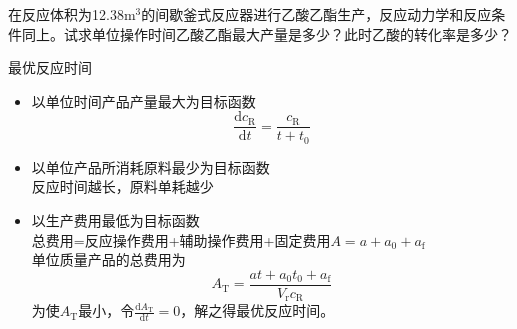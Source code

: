 \begin{frame}[t]{}
    \begin{example}
        在反应体积为12.38m$^3$的间歇釜式反应器进行乙酸乙酯生产，反应动力学和反应条件同上。试求单位操作时间乙酸乙酯最大产量是多少？此时乙酸的转化率是多少？
    \end{example}
\end{frame}

\begin{frame}{最优反应时间}
    \begin{itemize}
        \item 以单位时间产品产量最大为目标函数 $$\frac{\mathrm{d} c_{\mathrm{R}}}{\mathrm{d} t}=\frac{c_{\mathrm{R}}}{t+t_{0}}$$
        \item 以单位产品所消耗原料最少为目标函数\\\qquad 反应时间越长，原料单耗越少
        \item 以生产费用最低为目标函数\\\qquad 总费用=反应操作费用+辅助操作费用+固定费用$A=a+a_0+a_\mathrm{f}$\\\qquad 单位质量产品的总费用为$$A_{\mathrm{T}}=\frac{a t+a_{0} t_{0}+a_{\mathrm{f}}}{V_{\mathrm{r}} c_{\mathrm{R}}}$$\qquad 为使$A_{\mathrm{T}}$最小，令$\frac{\mathrm{d} A_{\mathrm{T}}}{\mathrm{d} t}=0$，解之得最优反应时间。
    \end{itemize}
\end{frame}


